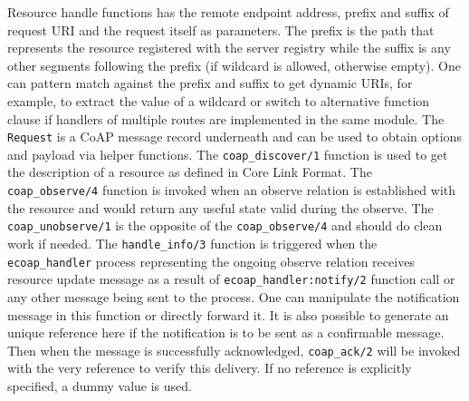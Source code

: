 
Resource handle functions has the remote endpoint address, prefix and suffix of request URI and the request itself as parameters. The prefix is the path that represents the resource registered with the server registry while the suffix is any other segments following the prefix (if wildcard is allowed, otherwise empty). One can pattern match against the prefix and suffix to get dynamic URIs, for example, to extract the value of a wildcard or switch to alternative function clause if handlers of multiple routes are implemented in the same module. The \verb|Request| is a CoAP message record underneath and can be used to obtain options and payload via helper functions. The \verb|coap_discover/1| function is used to get the description of a resource as defined in Core Link Format. The \verb|coap_observe/4| function is invoked when an observe relation is established with the resource and would return any useful state valid during the observe. The \verb|coap_unobserve/1| is the opposite of the \verb|coap_observe/4| and should do clean work if needed. The \verb|handle_info/3| function is triggered when the \verb|ecoap_handler| process representing the ongoing observe relation receives resource update message as a result of \verb|ecoap_handler:notify/2| function call or any other message being sent to the process. One can manipulate the notification message in this function or directly forward it. It is also possible to generate an unique reference here if the notification is to be sent as a confirmable message. Then when the message is successfully acknowledged, \verb|coap_ack/2| will be invoked with the very reference to verify this delivery. If no reference is explicitly specified, a dummy value is used. 

